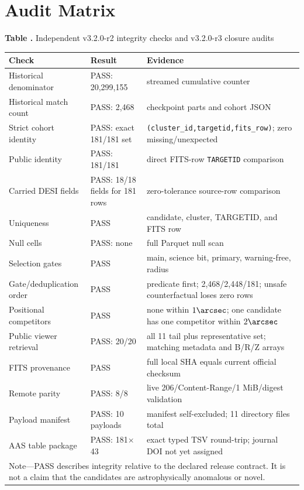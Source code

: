 \documentclass[twocolumn]{aastex701}
\newcommand{\paperVersion}{v3.2.0-r3}
\newcommand{\releaseVersion}{v3.2.0-r2}
\begin{document}
\section{Audit Matrix}\label{app:audit}

\label{tab:audit}
\begin{center}
\textbf{Table \thetable.} Independent \releaseVersion{} integrity checks and \paperVersion{} closure audits

\smallskip
\scriptsize
\begin{tabular}{p{}p{}p{}}
\toprule
Check & Result & Evidence \\
\midrule
Historical denominator & PASS: 20,299,155 & streamed cumulative counter \\
Historical match count & PASS: 2,468 & checkpoint parts and cohort JSON \\
Strict cohort identity & PASS: exact 181/181 set & \texttt{(cluster\_id,targetid,fits\_row)}; zero missing/unexpected \\
Public identity & PASS: 181/181 & direct FITS-row \texttt{TARGETID} comparison \\
Carried DESI fields & PASS: 18/18 fields for 181 rows & zero-tolerance source-row comparison \\
Uniqueness & PASS & candidate, cluster, TARGETID, and FITS row \\
Null cells & PASS: none & full Parquet null scan \\
Selection gates & PASS & main, science bit, primary, warning-free, radius \\
Gate/deduplication order & PASS & predicate first; 2,468/2,448/181; unsafe counterfactual loses zero rows \\
Positional competitors & PASS & none within $1\arcsec$; one candidate has one competitor within $2\arcsec$ \\
Public viewer retrieval & PASS: 20/20 & all 11 tail plus representative set; matching metadata and B/R/Z arrays \\
FITS provenance & PASS & full local SHA equals current official checksum \\
Remote parity & PASS: 8/8 & live 206/Content-Range/1 MiB/digest validation \\
Payload manifest & PASS: 10 payloads & manifest self-excluded; 11 directory files total \\
AAS table package & PASS: 181$\times$43 & exact typed TSV round-trip; journal DOI not yet assigned \\
\bottomrule
\multicolumn{3}{p{0.88\textwidth}}{\footnotesize Note---PASS describes integrity relative to the
declared release contract. It is not a claim that the candidates are astrophysically anomalous
or novel.}\\
\end{tabular}
\end{center}
\end{document}
